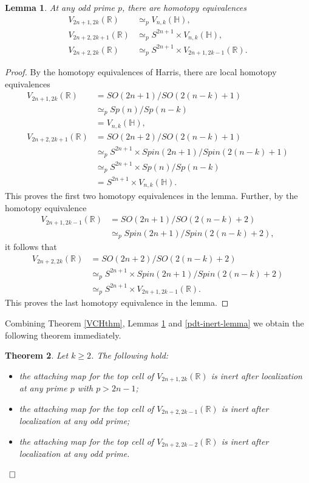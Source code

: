 \documentclass[a4]{amsart}
\newtheorem{theorem}{Theorem}[section]
\newtheorem{lemma}[theorem]{Lemma}
\theoremstyle{definition}
\newcommand{\qqed}{\hfill\Box}
\begin{document}
\begin{sloppypar}
\begin{lemma}\label{VHarlemma}
At any odd prime $p$, there are homotopy equivalences 
\[
\begin{split}
V_{2n+1,2k}(\mathbb{R})&\simeq_{p}V_{n,k}(\mathbb{H}),\\
V_{2n+2, 2k+1}(\mathbb{R})  &\simeq_{p}S^{2n+1} \times V_{n,k}(\mathbb{H}),\\
V_{2n+2, 2k}(\mathbb{R}) & \simeq_{p} S^{2n+1}\times V_{2n+1,2k-1}(\mathbb{R}).
\end{split}
\]
\end{lemma}
\begin{proof}
By the homotopy equivalences of Harris, there are local homotopy equivalences
\[
\begin{split}
V_{2n+1,2k}(\mathbb{R})&=SO(2n+1)/SO(2(n-k)+1) \\ &\simeq_{p} Sp(n)/Sp(n-k)\\
            &=V_{n,k}(\mathbb{H}),\\
V_{2n+2, 2k+1}(\mathbb{R})&=SO(2n+2)/SO(2(n-k)+1)\\ 
&\simeq_{p} S^{2n+1}\times Spin(2n+1)/Spin(2(n-k)+1) \\
&\simeq_{p} S^{2n+1}\times Sp(n)/Sp(n-k) \\
&= S^{2n+1} \times V_{n,k}(\mathbb{H}).
\end{split}
\] 
This proves the first two homotopy equivalences in the lemma. Further, by the homotopy equivalence
\[
\begin{split}
V_{2n+1, 2k-1}(\mathbb{R})&=SO(2n+1)/SO(2(n-k)+2)\\
&\simeq_{p} Spin(2n+1)/Spin(2(n-k)+2),
\end{split}
\]
it follows that 
\[
\begin{split}
V_{2n+2, 2k}(\mathbb{R})&=SO(2n+2)/SO(2(n-k)+2)\\ 
&\simeq_{p} S^{2n+1}\times Spin(2n+1)/Spin(2(n-k)+2) \\
&\simeq_{p}  S^{2n+1}\times V_{2n+1, 2k-1}(\mathbb{R}).
\end{split}
\] 
This proves the last homotopy equivalence in the lemma. 
\end{proof}

Combining Theorem \ref{VCHthm}, Lemmas \ref{VHarlemma} and \ref{pdt-inert-lemma} we obtain the following theorem immediately. 
\begin{theorem}\label{VRthm}
Let $k\geq 2$. The following hold: 
\begin{itemize}
\item the attaching map for the top cell of $V_{2n+1,2k}(\mathbb{R})$ is inert after localization at any prime $p$ with $p>2n-1$;
\item the attaching map for the top cell of $V_{2n+2, 2k-1}(\mathbb{R})$ is inert after localization at any odd prime;
\item the attaching map for the top cell of $V_{2n+2, 2k-2}(\mathbb{R})$ is inert after localization at any odd prime.
\end{itemize}
 ~$\qqed$
\end{theorem}


\end{sloppypar}
\end{document}
